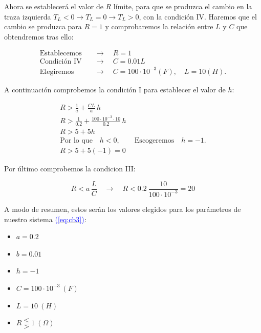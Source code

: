 \documentclass[12pt,a4paper]{report} %
\newcommand{\eref}[1]{\hyperref[#1]{\textcolor{blue}{(\ref*{#1})}}}
\newcommand{\eref}[1]{\hyperref[#1]{\textcolor{blue}{\textit{(\ref*{#1})}}}}
\begin{document}
	\vspace{0.5cm}\noindent Ahora se establecerá el valor de $R$ límite, para que se produzca el cambio en la traza izquierda $T_L<0 \rightarrow T_L=0 \rightarrow T_L>0$, con la condición IV. Haremos que el cambio se produzca para $R=1$ y comprobaremos la relación entre $L$ y $C$ que obtendremos tras ello:
	
	\begin{equation*}
		\begin{aligned}
			\text{Establecemos} \quad &\longrightarrow \quad R=1 \\[2mm]
			\text{Condición IV} \quad &\longrightarrow \quad C=0.01L\\[2mm]
			\text{Elegiremos} \quad &\longrightarrow \quad C=100\cdot10^{-3}(F), \quad L=10(H).
		\end{aligned}
	\end{equation*}\smallskip
	
	\vspace{0.5cm}\noindent A continuación comprobemos la condición I para establecer el valor de $h$:
	
	\begin{equation*}
	\begin{gathered}
		R>\frac{1}{a}+\frac{CL}{a}\, h\\[3mm] R>\frac{1}{0.2}+\frac{100\cdot10^{-3}\cdot10}{0.2}\, h \\[3mm]
		R>5+5h \\[3mm]
		\text{Por lo que}\quad h<0, \qquad \text{Escogeremos}\quad h=-1.\\[3mm]
		R>5+5(-1)=0
	\end{gathered}
	\end{equation*}\smallskip
	
	\vspace{0.5cm}\noindent Por último comprobemos la condicion III:
	
	\begin{equation*}
		R<a \, \frac{L}{C} \quad \longrightarrow \quad R<0.2\:\frac{10}{100\cdot10^{-3}}=20
	\end{equation*}
	
	\newpage
	
	A modo de resumen, estos serán los valores elegidos para los parámetros de nuestro sistema \eref{eq:cb3}:
	
	\begin{itemize}
		\label{condiconesh}
		\item $a=0.2$
		\item $b=0.01$
		\item $h=-1$
		\item $C=100\cdot10^{-3}\:(F)$
		\item $L=10\:(H)$
		\item $R\lesseqqgtr1\:(\Omega)$
	\end{itemize}
	
\end{document}
